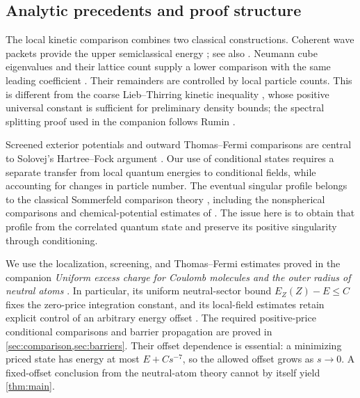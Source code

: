 \subsection{Analytic precedents and proof structure}

The local kinetic comparison combines two classical constructions.
Coherent wave packets provide the upper semiclassical energy
\cite[Section~V.A.1]{Lieb1981ThomasFermi}; see also
\cite[Lemma~8.2]{Solovej2003}. Neumann cube eigenvalues and their lattice
count supply a lower comparison with the same leading coefficient
\cite[Theorems~III.10--III.13]{LiebSimon1977}. Their remainders are controlled
by local particle counts. This is different from the coarse
Lieb--Thirring kinetic inequality \cite{LiebThirring1975}, whose positive
universal constant is sufficient for preliminary density bounds; the
spectral splitting proof used in the companion follows Rumin
\cite[Theorem~1.4 and Section~3.1]{Rumin2011}.

Screened exterior potentials and outward Thomas--Fermi comparisons are
central to Solovej's Hartree--Fock argument
\cite[Sections~6, 10, and~12]{Solovej2003}. Our use of conditional states
requires a separate transfer from local quantum energies to conditional
fields, while accounting for changes in particle number. The eventual
singular profile belongs to the classical Sommerfeld comparison theory
\cite[Section~IV]{LiebSimon1977}, including the nonspherical comparisons
and chemical-potential estimates of
\cite[Lemma~4.4, Remark~4.5, Theorem~4.6, and Corollary~4.7]{Solovej2003}.
The issue here is to obtain that profile from the correlated quantum
state and preserve its positive singularity through conditioning.


We use the localization, screening, and Thomas--Fermi estimates proved in
the companion \emph{Uniform excess charge for Coulomb molecules and the
outer radius of neutral atoms} \cite{Foundation}.
In particular, its uniform neutral-sector bound $E_Z(Z)-E\le C$ fixes
the zero-price integration constant, and its local-field estimates retain
explicit control of an arbitrary energy offset
\cite[\FNeutralOffset\ and \FLocalField]{Foundation}.
The required positive-price conditional comparisons and barrier
propagation are proved in \cref{sec:comparison,sec:barriers}.
Their offset dependence is essential: a minimizing priced state has
energy at most $E+Cs^{-7}$, so the allowed offset grows as $s\to0$.
A fixed-offset conclusion from the neutral-atom theory cannot by itself
yield \cref{thm:main}.

